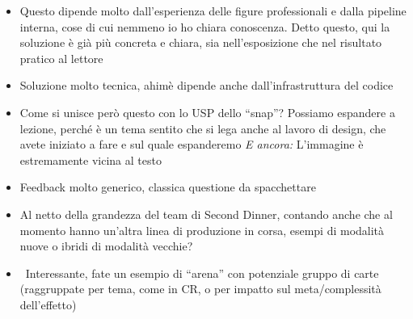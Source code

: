 {\begin{itemize}
  \item {} Questo dipende molto dall'esperienza delle figure professionali e dalla pipeline interna, cose di cui nemmeno io ho chiara conoscenza. Detto questo, qui la soluzione è già più concreta e chiara, sia nell'esposizione che nel risultato pratico al lettore
  \item {} Soluzione molto tecnica, ahimè dipende anche dall'infrastruttura del codice
  \item {} Come si unisce però questo con lo USP dello ``snap''? Possiamo espandere a lezione, perché è un tema sentito che si lega anche al lavoro di design, che avete iniziato a fare e sul quale espanderemo \emph{E ancora:} L'immagine è estremamente vicina al testo
  \item {} Feedback molto generico, classica questione da spacchettare
  \item {} Al netto della grandezza del team di Second Dinner, contando anche che al momento hanno un'altra linea di produzione in corsa, esempi di modalità nuove o ibridi di modalità vecchie?
  \item {} \rvBene\ Interessante, fate un esempio di ``arena'' con potenziale gruppo di carte (raggruppate per tema, come in CR, o per impatto sul meta/complessità dell'effetto)
\end{itemize}
}

